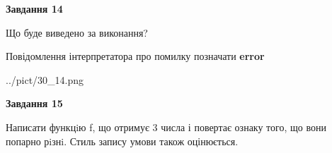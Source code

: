 \documentclass[11pt, ukrainian]{article}
\begin{document}
{\begin {large}
{\begin {center}\textbf{Завдання 14}\end {center}}\par
Що буде виведено за виконання? \par
Повідомлення інтерпретатора про помилку позначати \textbf{error}

\begin{center}
	{../pict/30_14.png}
\end{center}
\newpage

{\begin {center}\textbf{Завдання 15}\end {center}}\par

Написати функцiю f, що отримує 3 числа і повертає ознаку того, що вони попарно рiзнi. Стиль запису умови також оцінюється.\par
\newpage

\end {large}}
\end{document}
